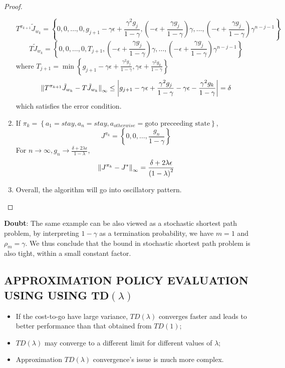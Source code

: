 \begin{example}
\begin{proof}
\begin{enumerate}
\[                    T^{\pi_{k+1}} \tilde J_{w_k} = \left\{ 0, 0, \ldots, 0, g_{j+1} - \gamma\epsilon + \frac{\gamma^2 g_j}{1 - \gamma}, \left( -\epsilon + \frac{\gamma g_j}{1 - \gamma} \right)\gamma, \ldots, \left( -\epsilon + \frac{\gamma g_j}{1 - \gamma}  \right)\gamma^{n - j - 1} \right\}
                \]
                \[
                    T \tilde J_{w_k} = \left\{ 0, 0, \ldots, 0, T_{j+1}, \left( -\epsilon + \frac{\gamma g_j}{1 - \gamma} \right)\gamma, \ldots, \left( -\epsilon + \frac{\gamma g_j}{1 - \gamma}  \right)\gamma^{n - j - 1} \right\}
                \]
                where $ T_{j+1} = \min\left\{ g_{j+1} - \gamma\epsilon + \frac{\gamma^2 g_j}{1 - \gamma}, \gamma \epsilon + \frac{\gamma^2 g_k}{1 - \gamma}   \right\} $
                \[
                    {\Arrowvert T^{\pi_{k+1}}\tilde J_{w_k} - T\tilde J_{w_k} \Arrowvert}_\infty \le
                    \left| g_{j+1} - \gamma\epsilon + \frac{\gamma^2 g_j}{1 - \gamma} - \gamma \epsilon - \frac{\gamma^2 g_k}{1 - \gamma} \right| = \delta
                \]
                which satisfies the error condition.
            \item If $ \pi_k = \left\{ a_1 = stay, a_n = stay, a_{otherwise} = \text{goto preceeding state} \right\} $,
                \[
                   J^{\pi_k} = \left\{ 0, 0, \ldots, \frac{g_n}{1 - \gamma} \right\}   
                \]
                For $ n \rightarrow \infty, g_n \rightarrow \frac{\delta + 2 \lambda \epsilon}{1 - \lambda} $,
                \[
                    {\Arrowvert J^{\pi_k} - J^{*} \Arrowvert}_\infty = \frac{\delta + 2\lambda\epsilon}{{(1 - \lambda)}^2} 
                \]
                \item Overall, the algorithm will go into oscillatory pattern.
        \end{enumerate}
    \end{proof}
\end{example}

\textbf{Doubt}:
The same example can be also viewed as a stochastic shortest path problem, by interpreting $ 1 - \gamma $ as a termination probability, we have $ m = 1 $ and $ \rho_m = \gamma $. We thus conclude that the bound in stochastic shortest path problem is also tight, within a small constant factor.

\subsection{APPROXIMATION POLICY EVALUATION USING USING TD$ (\lambda) $}%
\begin{itemize}
    \item If the cost-to-go have large variance, $ TD(\lambda) $ converges faster and leads to better performance than that obtained from $ TD(1) $;
    \item $ TD(\lambda) $ may converge to a different limit for different values of $ \lambda $;
    \item Approximation $ TD(\lambda) $ convergence's issue is much more complex. 
\end{itemize}

